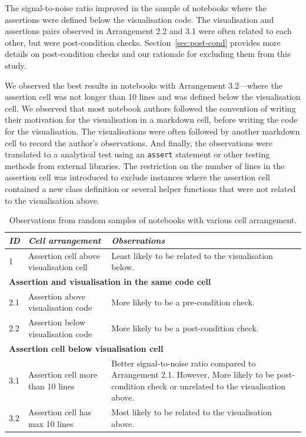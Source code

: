 \documentclass[conference]{IEEEtran}
\begin{document}
The signal-to-noise ratio improved in the sample of notebooks where the assertions were defined below the visualisation code. The visualisation and assertions pairs observed in Arrangement 2.2 and 3.1 were often related to each other, but were post-condition checks. Section~\ref{sec:post-cond} provides more details on post-condition checks and our rationale for excluding them from this study.

We observed the best results in notebooks with Arrangement 3.2---where the assertion cell was not longer than 10 lines and was defined below the visualisation cell. We observed that most notebook authors followed the convention of writing their motivation for the visualisation in a markdown cell, before writing the code for the visualisation. The visualisations were often followed by another markdown cell to record the author's observations. And finally, the observations were translated to a analytical test using an \texttt{assert} statement or other testing methods from external libraries. The restriction on the number of lines in the assertion cell was introduced to exclude instances where the assertion cell contained a new class definition or several helper functions that were not related to the visualisation above.

\begin{table}
  \centering
  \caption{Observations from random samples of notebooks with various
  cell arrangement.}
  \begin{tabular}{@{}l p{} p{}@{}}
    \toprule
    \emph{\textbf{ID}}&
    \emph{\textbf{Cell arrangement}} &
    \emph{\textbf{Observations}}\\
    \midrule
    1 &
    Assertion cell above visualisation cell &
    Least likely to be related to the visualisation below.\\
    \midrule
    \multicolumn{3}{l}{\textbf{Assertion and visualisation in the same code cell}}\\
    \midrule
    2.1 &
    Assertion above visualisation code &
    More likely to be a pre-condition check.\\
    2.2 &
    Assertion below visualisation code &
    More likely to be a post-condition check.\\
    \midrule
    \multicolumn{3}{l}{\textbf{Assertion cell below visualisation cell}}\\
    \midrule
    3.1 &
    Assertion cell more than 10 lines &
    Better signal-to-noise ratio compared to Arrangement 2.1. However, More likely to be post-condition check or unrelated to the visualisation above.\\
    3.2 &
    Assertion cell has max 10 lines &
    Most likely to be related to the visualisation above.\\
    \bottomrule
  \end{tabular}
  \label{tab:cell-arrangement}
\end{table}
\end{document}
